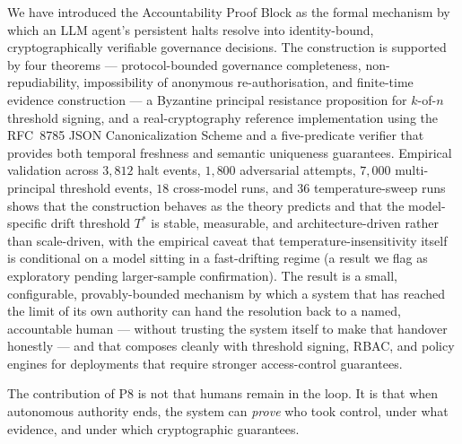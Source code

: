 \documentclass[11pt]{article}
\newcommand{\Tstar}{T^*}
\begin{document}
We have introduced the Accountability Proof Block as the formal
mechanism by which an LLM agent's persistent halts resolve into
identity-bound, cryptographically verifiable governance decisions.
The construction is supported by four theorems ---
protocol-bounded governance completeness, non-repudiability,
impossibility of anonymous re-authorisation, and finite-time
evidence construction --- a Byzantine principal resistance
proposition for $k$-of-$n$ threshold signing, and a real-cryptography
reference implementation using the RFC~8785 JSON Canonicalization
Scheme and a five-predicate verifier that provides both temporal
freshness and semantic uniqueness guarantees. Empirical validation
across $3{,}812$ halt events, $1{,}800$ adversarial attempts,
$7{,}000$ multi-principal threshold events, $18$ cross-model runs,
and $36$ temperature-sweep runs shows that the
construction behaves as the theory predicts and that the model-specific
drift threshold $\Tstar$ is stable, measurable, and architecture-driven
rather than scale-driven, with the empirical caveat that
temperature-insensitivity itself is conditional on a model sitting
in a fast-drifting regime (a result we flag as exploratory pending
larger-sample confirmation). The result is a small, configurable,
provably-bounded mechanism by which a system that has reached the
limit of its own authority can hand the resolution back to a
named, accountable human --- without trusting the system itself
to make that handover honestly --- and that composes cleanly with
threshold signing, RBAC, and policy engines for deployments that
require stronger access-control guarantees.

The contribution of P8 is not that humans remain in the loop.
It is that when autonomous authority ends, the system can
\emph{prove} who took control, under what evidence, and under
which cryptographic guarantees.



\end{document}
